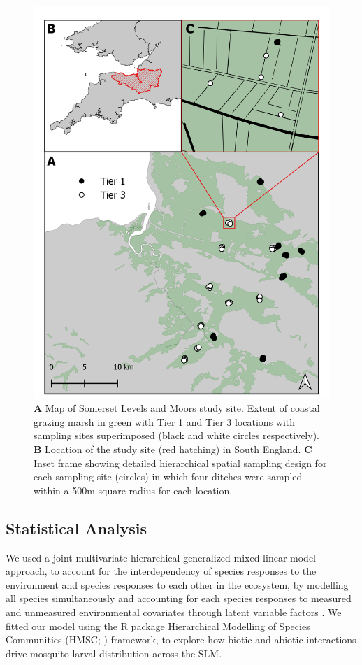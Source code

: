 \documentclass[lineno,sn-basic]{sn-jnl}%
\begin{document}
\begin{figure}[h!htbp]
	\centering
	\includegraphics[width=0.9\linewidth]{map}
	\caption{\textbf{A} Map of Somerset Levels and Moors study site. Extent of coastal grazing marsh in green with Tier 1 and Tier 3 locations with sampling sites superimposed (black and white circles respectively). \textbf{B} Location of the study site (red hatching) in South England. \textbf{C} Inset frame showing detailed hierarchical spatial sampling design for each sampling site (circles) in which four ditches were sampled within a 500m square radius for each location.}
	\label{fig:map}
\end{figure}

\subsection{Statistical Analysis}\label{statisticalanalyses}

We used a joint multivariate hierarchical generalized mixed linear model approach, to account for the interdependency of species responses to the environment and species responses to each other in the ecosystem, by modelling all species simultaneously and accounting for each species responses to measured and unmeasured environmental covariates through latent variable factors \citep{wilkinsonComparisonJointSpecies2019}. We fitted our model using the R package Hierarchical Modelling of Species Communities (HMSC; \cite{ovaskainenHowMakeMore2017, ovaskainenJointSpeciesDistribution2020}) framework, to explore how biotic and abiotic interactions drive mosquito larval distribution across the SLM. 
\end{document}

